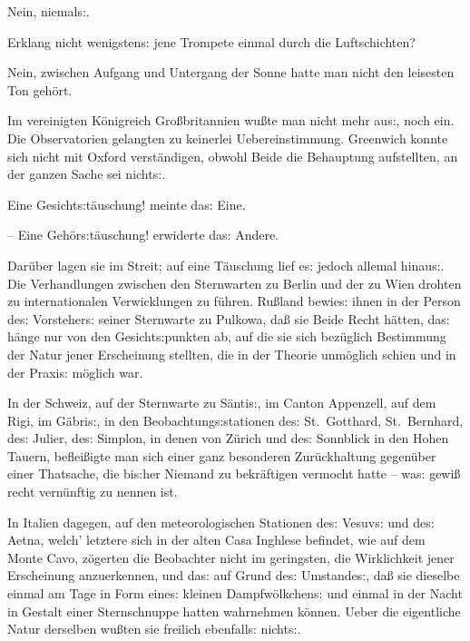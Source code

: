 \documentclass[oneside,12pt]{book}
\newcommand{\s}{s:}
\begin{document}
Nein, niemal{\s}.

Erklang nicht wenigsten{\s} jene Trompete einmal durch die
Luftschichten?

Nein, zwischen Aufgang und Untergang der Sonne hatte man nicht den
leisesten Ton geh\"ort.

Im vereinigten K\"onigreich Gro{\ss}britannien wu{\ss}te man nicht
mehr au{\s}, noch ein. Die Observatorien gelangten zu keinerlei
Uebereinstimmung. Greenwich konnte sich nicht mit Oxford
verst\"andigen, obwohl Beide die Behauptung aufstellten, {\glqq}an
der ganzen Sache sei nicht{\s}{\grqq}.

{\glqq}Eine Gesicht{\s}t\"auschung! meinte da{\s} Eine.

-- Eine Geh\"or{\s}t\"auschung!{\grqq} erwiderte da{\s} Andere.

Dar\"uber lagen sie im Streit; auf eine T\"auschung lief e{\s} jedoch
allemal hinau{\s}. Die Verhandlungen zwischen den Sternwarten zu
Berlin und der zu Wien drohten zu internationalen Verwicklungen zu
f\"uhren. Ru{\ss}land bewie{\s} ihnen in der Person de{\s}
Vorsteher{\s} seiner Sternwarte zu Pulkowa, da{\ss} sie Beide Recht
h\"atten, da{\s} h\"ange nur von den Gesicht{\s}punkten ab, auf die
sie sich bez\"uglich Bestimmung der Natur jener Erscheinung stellten,
die in der Theorie unm\"oglich schien und in der Praxi{\s} m\"oglich
war.

In der Schweiz, auf der Sternwarte zu S\"anti{\s}, im Canton
Appenzell, auf dem Rigi, im G\"abri{\s}, in den
Beobachtung{\s}stationen de{\s} St.~Gotthard, St.~Bernhard, de{\s}
Julier, de{\s} Simplon, in denen von Z\"urich und de{\s} Sonnblick in
den Hohen Tauern, beflei{\ss}igte man sich einer ganz besonderen
Zur\"uckhaltung gegen\"uber einer Thatsache, die bi{\s}her Niemand zu
bekr\"aftigen vermocht hatte -- wa{\s} gewi{\ss} recht vern\"unftig
zu nennen ist.

In Italien dagegen, auf den meteorologischen Stationen de{\s}
Vesuv{\s} und de{\s} Aetna, welch' letztere sich in der alten Casa
Inghlese befindet, wie auf dem Monte Cavo, z\"ogerten die Beobachter
nicht im geringsten, die Wirklichkeit jener Erscheinung anzuerkennen,
und da{\s} auf Grund de{\s} Umstande{\s}, da{\ss} sie dieselbe einmal
am Tage in Form eine{\s} kleinen Dampfw\"olkchen{\s} und einmal in
der Nacht in Gestalt einer Sternschnuppe hatten wahrnehmen k\"onnen.
Ueber die eigentliche Natur derselben wu{\ss}ten sie freilich
ebenfall{\s} nicht{\s}.
\end{document}
